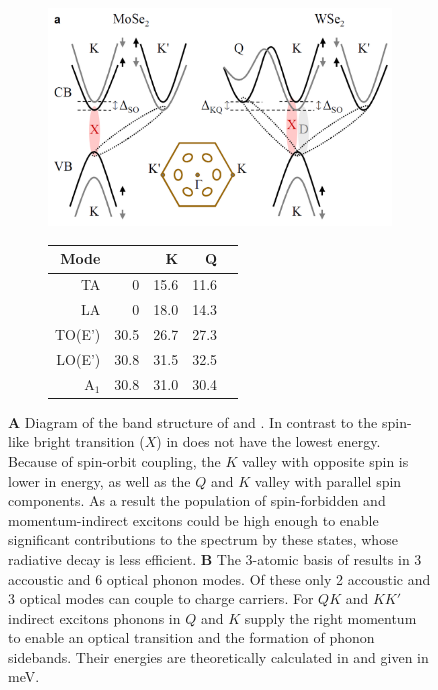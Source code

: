 \begin{figure}[t]
\centering
\begin{subfigure}{0.69\textwidth}
	\caption{}
	\includegraphics[width=.8\textwidth]{Band_structure_momentum_dark}
\end{subfigure}
\begin{subfigure}{0.3\textwidth}
	\caption{}
	\begin{tabular}{@{}rrrrr@{}}
	\toprule
	Mode&\Gamma&K&Q\\
	\midrule
	TA&0&15.6&11.6\\
	LA&0&18.0&14.3\\
	TO(E')&30.5&26.7&27.3\\
	LO(E')&30.8&31.5&32.5\\
	A$_1$&30.8&31.0&30.4\\
	\bottomrule
	\end{tabular}
\end{subfigure}
\caption{\textbf{A} Diagram of the band structure of \mose and \wse\!\cite{lindlau_identifying_2017}. In contrast to \mose the spin-like bright transition ($X$) in \wse does not have the lowest energy. Because of spin-orbit coupling, the $K$ valley with opposite spin is lower in energy, as well as the $Q$ and $K$ valley with parallel spin components. As a result the population of spin-forbidden and momentum-indirect excitons could be high enough to enable significant contributions to the \pl spectrum by these states, whose radiative decay is less efficient. \textbf{B} The 3-atomic basis of \tmds results in 3 accoustic and 6 optical phonon modes. Of these only 2 accoustic and 3 optical modes can couple to charge carriers. For $QK$ and $KK'$ indirect excitons phonons in $Q$ and $K$ supply the right momentum to enable an optical transition and the formation of phonon sidebands. Their energies are theoretically calculated in \cite{jin_intrinsic_2014} and given in meV. }\label{phonon_band}
\end{figure}


